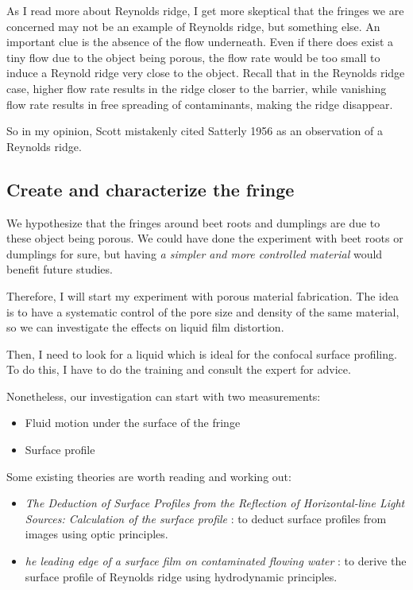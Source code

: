 \documentclass[12pt]{article}
\begin{document}
As I read more about Reynolds ridge, I get more skeptical that the fringes we are concerned may not be an example of Reynolds ridge, but something else. An important clue is the absence of the flow underneath. Even if there does exist a tiny flow due to the object being porous, the flow rate would be too small to induce a Reynold ridge very close to the object. Recall that in the Reynolds ridge case, higher flow rate results in the ridge closer to the barrier, while vanishing flow rate results in free spreading of contaminants, making the ridge disappear.

So in my opinion, Scott mistakenly cited Satterly 1956 \cite{Satterly1956} as an observation of a Reynolds ridge. 

\subsection{Create and characterize the fringe}

We hypothesize that the fringes around beet roots and dumplings are due to these object being porous. We could have done the experiment with beet roots or dumplings for sure, but having \emph{a simpler and more controlled material} would benefit future studies. 

Therefore, I will start my experiment with porous material fabrication. The idea is to have a systematic control of the pore size and density of the same material, so we can investigate the effects on liquid film distortion.

Then, I need to look for a liquid which is ideal for the confocal surface profiling. To do this, I have to do the training and consult the expert for advice.

Nonetheless, our investigation can start with two measurements:
%
\begin{itemize}
    \item Fluid motion under the surface of the fringe
    \item Surface profile
\end{itemize}
%
Some existing theories are worth reading and working out:
%
\begin{itemize}
    \item \emph{The Deduction of Surface Profiles from the Reflection of Horizontal-line Light Sources: Calculation of the surface profile} \cite{Gilbert1980}: to deduct surface profiles from images using optic principles.
    \item \emph{he leading edge of a surface film on contaminated flowing water} \cite{Harper1974}: to derive the surface profile of Reynolds ridge using hydrodynamic principles.
\end{itemize}
\end{document}
